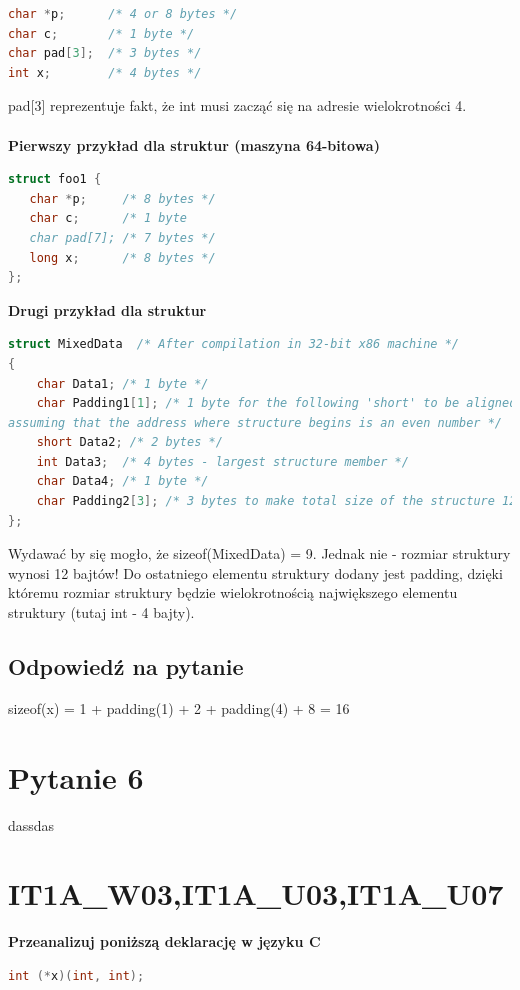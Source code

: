 \begin{lstlisting}[language=c]
char *p;      /* 4 or 8 bytes */
char c;       /* 1 byte */
char pad[3];  /* 3 bytes */
int x;        /* 4 bytes */
\end{lstlisting}
pad[3] reprezentuje fakt, że int musi zacząć się na adresie wielokrotności 4. \\\\
\textbf{Pierwszy przykład dla struktur (maszyna 64-bitowa)}
\begin{lstlisting}[language=c]
struct foo1 {
   char *p;     /* 8 bytes */
   char c;      /* 1 byte
   char pad[7]; /* 7 bytes */
   long x;      /* 8 bytes */
};
\end{lstlisting}
\textbf{Drugi przykład dla struktur}
\begin{lstlisting}[language=c]
struct MixedData  /* After compilation in 32-bit x86 machine */
{
    char Data1; /* 1 byte */
    char Padding1[1]; /* 1 byte for the following 'short' to be aligned on a 2 byte boundary
assuming that the address where structure begins is an even number */
    short Data2; /* 2 bytes */
    int Data3;  /* 4 bytes - largest structure member */
    char Data4; /* 1 byte */
    char Padding2[3]; /* 3 bytes to make total size of the structure 12 bytes */
};
\end{lstlisting}
Wydawać by się mogło, że sizeof(MixedData) = 9. Jednak nie - rozmiar struktury wynosi 12 bajtów! Do ostatniego elementu struktury dodany jest padding, dzięki któremu rozmiar struktury będzie wielokrotnością największego elementu struktury (tutaj int - 4 bajty).

\subsection{Odpowiedź na pytanie} 
sizeof(x) = 1 + padding(1) + 2 + padding(4) + 8 = 16 


\section{Pytanie 6}dassdas


\section{IT1A\_W03,IT1A\_U03,IT1A\_U07} 
\textbf{Przeanalizuj poniższą deklarację w języku C}
\begin{lstlisting}[language=c]
int (*x)(int, int);
\end{lstlisting}

